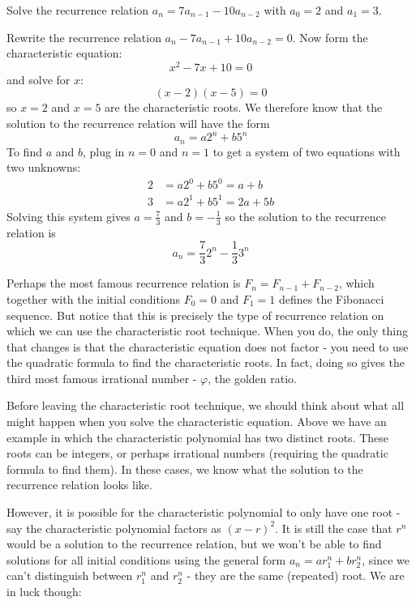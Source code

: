 \documentclass[12pt]{article}
\begin{document}
\begin{example}
  Solve the recurrence relation $a_n = 7a_{n-1} - 10 a_{n-2}$ with $a_0 = 2$ and $a_1 = 3$. 
  \begin{solution}
   Rewrite the recurrence relation $a_n - 7a_{n-1} + 10a_{n-2} = 0$.  Now form the characteristic equation:
   \[x^2 - 7x + 10 = 0\]
   and solve for $x$: 
   \[(x - 2) (x - 5) = 0\]
   so $x = 2$ and $x = 5$ are the characteristic roots.  We therefore know that the solution to the recurrence relation will have the form
   \[a_n = a 2^n + b 5^n\]  
   To find $a$ and $b$, plug in $n =0$ and $n = 1$ to get a system of two equations with two unknowns:
   \begin{align*}
    2 & = a 2^0 + b 5^0 = a + b\\
    3 & = a 2^1 + b 5^1 = 2a + 5b
   \end{align*}
  Solving this system gives $a = \frac{7}{3}$ and $b = -\frac{1}{3}$ so the solution to the recurrence relation is
  \[a_n = \frac{7}{3}2^n - \frac{1}{3} 3^n\]
  \end{solution}

\end{example}

Perhaps the most famous recurrence relation is $F_n = F_{n-1} + F_{n-2}$, which together with the initial conditions $F_0 = 0$ and $F_1= 1$ defines the Fibonacci sequence.  But notice that this is precisely the type of recurrence relation on which we can use the characteristic root technique.  When you do, the only thing that changes is that the characteristic equation does not factor - you need to use the quadratic formula to find the characteristic roots.  In fact, doing so gives the third most famous irrational number - $\varphi$, the golden ratio.

Before leaving the characteristic root technique, we should think about what all might happen when you solve the characteristic equation.  Above we have an example in which the characteristic polynomial has two distinct roots.  These roots can be integers, or perhaps irrational numbers (requiring the quadratic formula to find them).  In these cases, we know what the solution to the recurrence relation looks like.  

However, it is possible for the characteristic polynomial to only have one root - say the characteristic polynomial factors as $(x - r)^2$.  It is still the case that $r^n$ would be a solution to the recurrence relation, but we won't be able to find solutions for all initial conditions using the general form $a_n = ar_1^n + br_2^n$, since we can't distinguish between $r_1^n$ and $r_2^n$ - they are the same (repeated) root.  We are in luck though:
\end{document}
